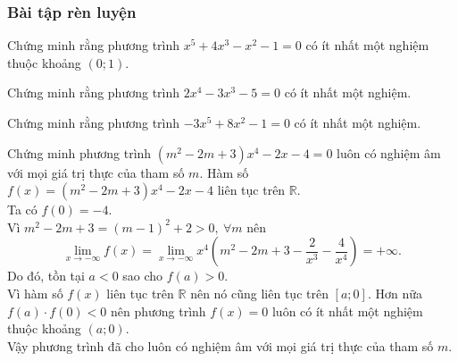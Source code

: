 \subsubsection{Bài tập rèn luyện}
\begin{bt}%
	Chứng minh rằng phương trình $x^5+4x^3-x^2-1=0$ có ít nhất một nghiệm thuộc khoảng $(0;1)$.
\end{bt}
\begin{bt}%
	Chứng minh rằng phương trình $ 2x^4-3x^3-5=0 $ có ít nhất một nghiệm.
\end{bt}
\begin{bt}%
	Chứng minh rằng phương trình $-3x^5+8x^2-1=0$ có ít nhất một nghiệm.
\end{bt}
\begin{bt}%
	Chứng minh phương trình $\left(m^2-2m+3\right)x^4-2x-4=0$ luôn có nghiệm âm với mọi giá trị thực của tham số $m$.
	\loigiai
	{Hàm số $f(x)=\left(m^2-2m+3\right)x^4-2x-4$ liên tục trên $\mathbb{R}$.\\
		Ta có $f(0)=-4$.\\
		Vì $m^2-2m+3=(m-1)^2+2>0,\ \forall m$ nên $$\lim\limits_{x\to -\infty} f(x)=\lim\limits_{x\to -\infty} x^4\left(m^2-2m+3-\dfrac{2}{x^3}-\dfrac{4}{x^4}\right)=+\infty.$$
		Do đó, tồn tại $a<0$ sao cho $f(a)>0$.\\
		Vì hàm số $f(x)$ liên tục trên $\mathbb{R}$ nên nó cũng liên tục trên $[a; 0]$. Hơn nữa $f(a)\cdot f(0)<0$ nên phương trình $f(x)=0$ luôn có ít nhất một nghiệm thuộc khoảng $(a; 0)$.\\
		Vậy phương trình đã cho luôn có nghiệm âm với mọi giá trị thực của tham số $m$.
	}
\end{bt}

